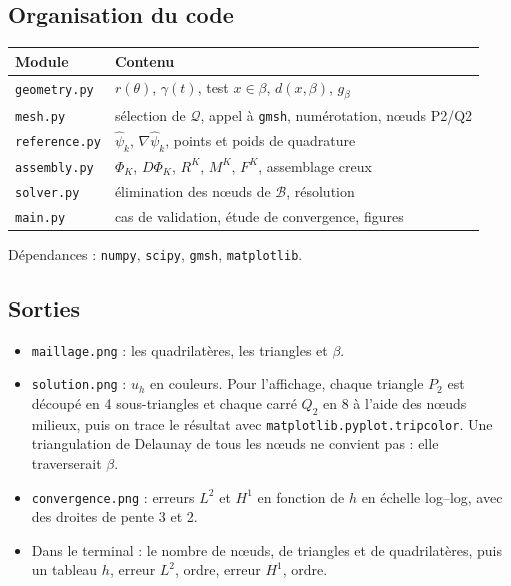\documentclass[11pt,a4paper]{article}
\begin{document}
\subsection{Organisation du code}

\begin{center}
\begin{tabular}{ll}
\hline
Module & Contenu \\
\hline
\texttt{geometry.py}  & $r(\theta)$, $\gamma(t)$, test $x \in \beta$, $d(x,\beta)$, $g_\beta$ \\
\texttt{mesh.py}      & sélection de $\mathcal{Q}$, appel à \texttt{gmsh}, numérotation, nœuds P2/Q2 \\
\texttt{reference.py} & $\widehat{\psi}_k$, $\nabla\widehat{\psi}_k$, points et poids de quadrature \\
\texttt{assembly.py}  & $\Phi_K$, $D\Phi_K$, $R^K$, $M^K$, $F^K$, assemblage creux \\
\texttt{solver.py}    & élimination des nœuds de $\mathcal{B}$, résolution \\
\texttt{main.py}      & cas de validation, étude de convergence, figures \\
\hline
\end{tabular}
\end{center}

Dépendances : \texttt{numpy}, \texttt{scipy}, \texttt{gmsh}, \texttt{matplotlib}.

\subsection{Sorties}

\begin{itemize}
  \item \texttt{maillage.png} : les quadrilatères, les triangles et $\beta$.
  \item \texttt{solution.png} : $u_h$ en couleurs. Pour l'affichage, chaque
        triangle $P_2$ est découpé en 4 sous-triangles et chaque carré $Q_2$
        en 8 à l'aide des nœuds milieux, puis on trace le résultat avec
        \texttt{matplotlib.pyplot.tripcolor}. Une triangulation de Delaunay
        de tous les nœuds ne convient pas : elle traverserait $\beta$.
  \item \texttt{convergence.png} : erreurs $L^2$ et $H^1$ en fonction de
        $h$ en échelle log--log, avec des droites de pente 3 et 2.
  \item Dans le terminal : le nombre de nœuds, de triangles et de
        quadrilatères, puis un tableau $h$, erreur $L^2$, ordre, erreur
        $H^1$, ordre.
\end{itemize}
\end{document}
